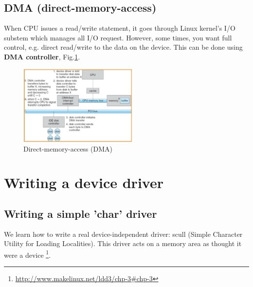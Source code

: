 \subsection{DMA (direct-memory-access)}
\label{sec:DMA}
\label{sec:direct-memory-access}

When CPU issues a read/write statement, it goes through Linux kernel's I/O
substem which manages all I/O request. However, some times, you want full
control, e.g. direct read/write to the data on the device. This can be done
using {\bf DMA controller}, Fig.\ref{fig:DMA}.

\begin{figure}[hbt]
  \centerline{\includegraphics[height=4cm,
  angle=0]{./images/DMA.eps}}
  \caption{Direct-memory-access (DMA)}
  \label{fig:DMA}
\end{figure}



\section{Writing a device driver}

\subsection{Writing a simple 'char' driver}

We learn how to write a real device-independent driver: scull (Simple Character
Utility for Loading Localities). This driver acts on a memory area as thought it
were a device \footnote{\url{http://www.makelinux.net/ldd3/chp-3\#chp-3}}. 

